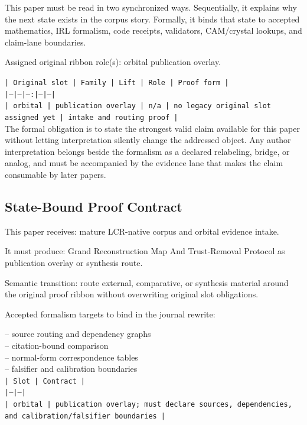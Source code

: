 \documentclass[11pt]{article}
\begin{document}
This paper must be read in two synchronized ways. Sequentially, it explains why
the next state exists in the corpus story. Formally, it binds that state to
accepted mathematics, IRL formalism, code receipts, validators, CAM/crystal
lookups, and claim-lane boundaries.

Assigned original ribbon role(s): orbital publication overlay.

\noindent\texttt{| Original slot | Family | Lift | Role | Proof form |}\\
\noindent\texttt{|---|---|---:|---|---|}\\
\noindent\texttt{| orbital | publication overlay | n/a | no legacy original slot assigned yet | intake and routing proof |}\\

The formal obligation is to state the strongest valid claim available for this
paper without letting interpretation silently change the addressed object. Any
author interpretation belongs beside the formalism as a declared relabeling,
bridge, or analog, and must be accompanied by the evidence lane that makes the
claim consumable by later papers.

\subsection*{State-Bound Proof Contract}

This paper receives: mature LCR-native corpus and orbital evidence intake.

It must produce: Grand Reconstruction Map And Trust-Removal Protocol as publication overlay or synthesis route.

Semantic transition: route external, comparative, or synthesis material around the original proof ribbon without overwriting original slot obligations.

Accepted formalism targets to bind in the journal rewrite:

\noindent{}-- source routing and dependency graphs\\
\noindent{}-- citation-bound comparison\\
\noindent{}-- normal-form correspondence tables\\
\noindent{}-- falsifier and calibration boundaries\\

\noindent\texttt{| Slot | Contract |}\\
\noindent\texttt{|---|---|}\\
\noindent\texttt{| orbital | publication overlay; must declare sources, dependencies, and calibration/falsifier boundaries |}\\
\end{document}

